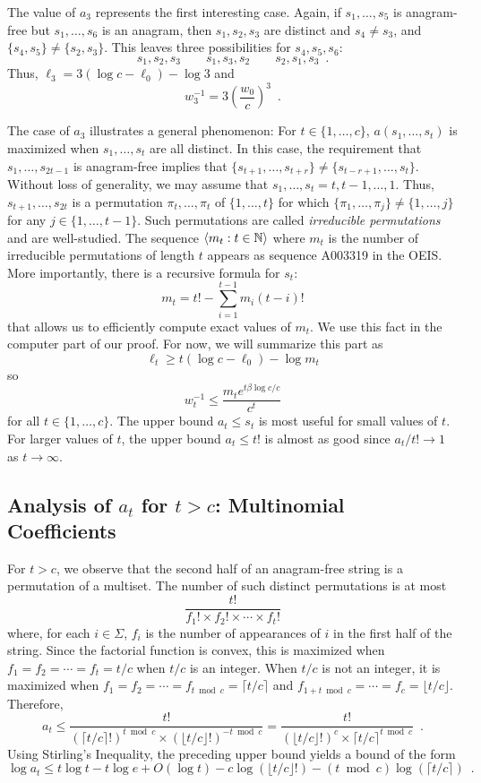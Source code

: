 \documentclass{patmorin}
\newcommand{\ceil}[1]{\lceil #1\rceil}
\newcommand{\floor}[1]{\lfloor #1\rfloor}
\begin{document}
The value of $a_3$ represents the first interesting case.  Again, if $s_1,\ldots,s_5$ is anagram-free but $s_1,\ldots,s_6$ is an anagram, then $s_1,s_2,s_3$ are distinct and $s_4\neq s_3$, and $\{s_4,s_5\}\neq \{s_2,s_3\}$.  This leaves three possibilities for $s_4,s_5,s_6$:
\[   s_1,s_2,s_3 \qquad s_1,s_3,s_2 \qquad s_2,s_1,s_3 \enspace . \]
Thus, $\ell_3 = 3(\log c - \ell_0) - \log 3$ and
\[
   w_3^{-1} = 3\left(\frac{w_0}{c}\right)^{3} \enspace .
\]

The case of $a_3$ illustrates a general phenomenon: For $t\in\{1,\ldots,c\}$, $a(s_1,\ldots,s_t)$ is maximized when $s_1,\ldots,s_t$ are all distinct.  In this case, the requirement that $s_1,\ldots,s_{2t-1}$ is anagram-free implies that $\{s_{t+1},\ldots,s_{t+r}\}\neq\{s_{t-r+1},\ldots,s_t\}$.  Without loss of generality, we may assume that $s_1,\ldots,s_t=t,t-1,\ldots,1$.  Thus, $s_{t+1},\ldots,s_{2t}$ is a permutation $\pi_t,\ldots,\pi_t$ of $\{1,\ldots,t\}$ for which $\{\pi_1,\ldots,\pi_j\}\neq\{1,\ldots,j\}$ for any $j\in\{1,\ldots,t-1\}$.  Such permutations are called \emph{irreducible permutations} and are well-studied.  The sequence $\langle m_t: t\in\mathbb{N}\rangle$ where $m_t$ is the number of irreducible permutations of length $t$ appears as sequence A003319 in the OEIS.  More importantly, there is a recursive formula for $s_t$:
\[
   m_t = t! - \sum_{i=1}^{t-1} m_i(t-i)!
\]
that allows us to efficiently compute exact values of $m_t$. We use this fact in the computer part of our proof.  For now, we will summarize this part as
\[
    \ell_t \ge t(\log c-\ell_0) - \log m_t
\]
so
\[
   w_t^{-1} \le \frac{m_t e^{t\beta\log c/c}}{c^t}
\]
for all $t\in\{1,\ldots,c\}$.  The upper bound $a_t \le s_t$ is most useful for small values of $t$.  For larger values of $t$, the upper bound $a_t \le t!$ is almost as good since $a_t/t!\rightarrow 1$ as $t\rightarrow\infty$.

\subsection{Analysis of $a_t$ for $t > c$: Multinomial Coefficients}

For $t>c$, we observe that the second half of an anagram-free string is a permutation of a multiset.  The number of such distinct permutations is at most
\[
    \frac{t!}{f_1!\times f_2!\times \cdots\times f_t!}
\]
where, for each $i\in\Sigma$, $f_i$ is the number of appearances of $i$ in the first half of the string.  Since the factorial function is convex, this is maximized when $f_1=f_2=\cdots=f_t=t/c$ when $t/c$ is an integer.  When $t/c$ is not an integer, it is maximized when $f_1=f_2=\cdots=f_{t\bmod c}=\ceil{t/c}$ and $f_{1+t\bmod c}=\cdots=f_c=\floor{t/c}$.  Therefore,
\[
    a_t \le \frac{t!}{(\ceil{t/c}!)^{t\bmod c}\times (\floor{t/c}!)^{-t\bmod c}}
    = \frac{t!}{(\floor{t/c}!)^c\times \ceil{t/c}^{t\bmod c}} \enspace .
\]
Using Stirling's Inequality, the preceding upper bound yields a bound of the form
\[
   \log a_t \le t\log t - t\log e + O(\log t) - c\log(\floor{t/c}!) - (t\bmod c)\log(\ceil{t/c}) \enspace .
\]
\end{document}
